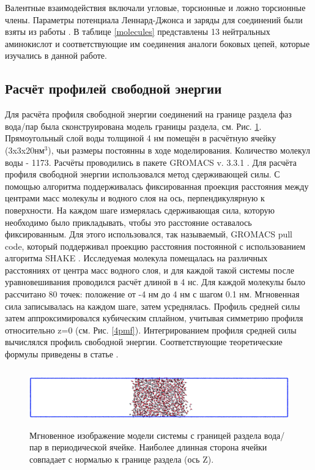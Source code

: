 Валентные взаимодействия включали угловые, торсионные и ложно торсионные члены. 
Параметры потенциала Леннард-Джонса и заряды для соединений были взяты из работы \cite{shirts_proteinff}.
В таблице \ref{molecules} представлены 13 нейтральных аминокислот и соответствующие им соединения аналоги боковых цепей, которые изучались в данной работе.



\subsection{\label{sec:fep_method} Расчёт профилей свободной энергии}
Для расчёта профиля свободной энергии соединений на границе раздела фаз вода/пар была сконструирована модель границы раздела, см. Рис. \ref{system}. Прямоугольный слой воды толщиной 4 нм помещён в расчётную ячейку (3x3x20нм$^3$), чьи размеры постоянны в ходе моделирования. Количество молекул воды - 1173. Расчёты проводились в пакете GROMACS  v. 3.3.1 \cite{gromacs}. Для расчёта профиля свободной энергии использовался метод сдерживающей силы. С помощью алгоритма поддерживалась фиксированная проекция  расстояния между центрами масс молекулы и водного слоя на ось, перпендикулярную к поверхности. На каждом шаге измерялась сдерживающая сила, которую необходимо было прикладывать, чтобы это расстояние оставалось фиксированным. Для этого использовался, так называемый, GROMACS pull code, который поддерживал проекцию расстояния постоянной с использованием алгоритма SHAKE \cite{shake}. Исследуемая молекула помещалась на различных расстояниях от центра масс водного слоя, и для каждой такой системы после уравновешивания проводился расчёт длиной в 4 нс. Для каждой молекулы было рассчитано 80 точек: положение от -4 нм до 4 нм с шагом 0.1 нм. Мгновенная сила записывалась на каждом шаге, затем усреднялась. Профиль средней силы затем аппроксимировался кубическим сплайном, учитывая симметрию профиля относительно z=0 (см. Рис. \ref{4pmf}). Интегрированием профиля средней силы вычислялся профиль свободной энергии. Соответствующие теоретические формулы приведены в статье \cite{shaytan_free_2010}.

     
\begin{figure}
\includegraphics[width=17cm,height=2.5cm]{system}
\caption{\label{system} Мгновенное изображение модели системы с границей раздела вода/пар в периодической ячейке. Наиболее длинная сторона ячейки совпадает с нормалью к границе раздела (ось Z).}
\end{figure}


